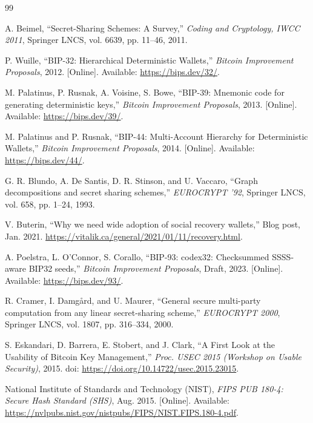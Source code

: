 \documentclass[11pt]{article}
\begin{document}
\begin{thebibliography}{99}

A. Beimel,
``Secret-Sharing Schemes: A Survey,''
\textit{Coding and Cryptology, IWCC 2011}, Springer LNCS, vol. 6639, pp. 11--46, 2011.

P. Wuille,
``BIP-32: Hierarchical Deterministic Wallets,''
\textit{Bitcoin Improvement Proposals}, 2012. [Online]. Available: \url{https://bips.dev/32/}.

M. Palatinus, P. Rusnak, A. Voisine, S. Bowe,
``BIP-39: Mnemonic code for generating deterministic keys,''
\textit{Bitcoin Improvement Proposals}, 2013. [Online]. Available: \url{https://bips.dev/39/}.

M. Palatinus and P. Rusnak,
``BIP-44: Multi-Account Hierarchy for Deterministic Wallets,''
\textit{Bitcoin Improvement Proposals}, 2014. [Online]. Available: \url{https://bips.dev/44/}.

G. R. Blundo, A. De Santis, D. R. Stinson, and U. Vaccaro,
``Graph decompositions and secret sharing schemes,''
\textit{EUROCRYPT '92}, Springer LNCS, vol. 658, pp. 1--24, 1993.

V. Buterin,
``Why we need wide adoption of social recovery wallets,''
Blog post, Jan. 2021. \url{https://vitalik.ca/general/2021/01/11/recovery.html}.

A. Poelstra, L. O'Connor, S. Corallo,
``BIP-93: codex32: Checksummed SSSS-aware BIP32 seeds,''
\textit{Bitcoin Improvement Proposals}, Draft, 2023. [Online]. Available: \url{https://bips.dev/93/}.

R. Cramer, I. Damg{\aa}rd, and U. Maurer,
``General secure multi-party computation from any linear secret-sharing scheme,''
\textit{EUROCRYPT 2000}, Springer LNCS, vol. 1807, pp. 316--334, 2000.

S. Eskandari, D. Barrera, E. Stobert, and J. Clark,
``A First Look at the Usability of Bitcoin Key Management,''
\textit{Proc. USEC 2015 (Workshop on Usable Security)}, 2015.
doi: \url{https://doi.org/10.14722/usec.2015.23015}.

National Institute of Standards and Technology (NIST),
\textit{FIPS PUB 180-4: Secure Hash Standard (SHS)}, Aug. 2015.
[Online]. Available: \url{https://nvlpubs.nist.gov/nistpubs/FIPS/NIST.FIPS.180-4.pdf}.


\end{thebibliography}
\end{document}

